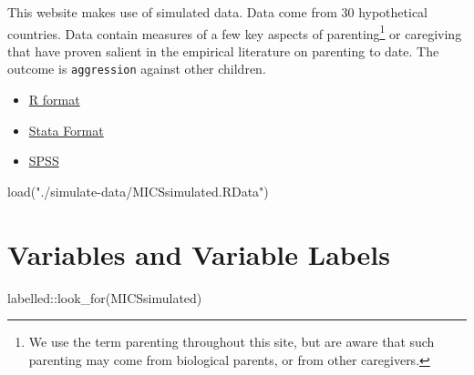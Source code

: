\documentclass[
  letterpaper,
  DIV=11,
  numbers=noendperiod]{scrreprt}
\newenvironment{Shaded}{\begin{snugshade}}{\end{snugshade}}
\newcommand{\FunctionTok}[1]{\textcolor[rgb]{0.28,0.35,0.67}{#1}}
\newcommand{\NormalTok}[1]{\textcolor[rgb]{0.00,0.23,0.31}{#1}}
\newcommand{\SpecialCharTok}[1]{\textcolor[rgb]{0.37,0.37,0.37}{#1}}
\newcommand{\StringTok}[1]{\textcolor[rgb]{0.13,0.47,0.30}{#1}}
\providecommand{\tightlist}{%
  \setlength{\itemsep}{0pt}\setlength{\parskip}{0pt}}\usepackage{longtable,booktabs,array}
\begin{document}
This website makes use of simulated data. Data come from 30 hypothetical
countries. Data contain measures of a few key aspects of
parenting\footnote{We use the term parenting throughout this site, but
  are aware that such parenting may come from biological parents, or
  from other caregivers.} or caregiving that have proven salient in the
empirical literature on parenting to date. The outcome is
\texttt{aggression} against other children.

\begin{tcolorbox}[enhanced jigsaw, bottomrule=.15mm, left=2mm, colframe=quarto-callout-note-color-frame, title=\textcolor{quarto-callout-note-color}{\faInfo}\hspace{0.5em}{Download The Data}, colback=white, leftrule=.75mm, coltitle=black, rightrule=.15mm, colbacktitle=quarto-callout-note-color!10!white, opacityback=0, toptitle=1mm, toprule=.15mm, breakable, opacitybacktitle=0.6, bottomtitle=1mm, arc=.35mm, titlerule=0mm]

\begin{itemize}
\tightlist
\item
  \href{https://github.com/agrogan1/globalfamilies/raw/main/simulate-data/MICSsimulated.RData}{R
  format}
\item
  \href{https://github.com/agrogan1/globalfamilies/raw/main/simulate-data/MICSsimulated.dta}{Stata
  Format}
\item
  \href{https://github.com/agrogan1/globalfamilies/raw/main/simulate-data/MICSsimulated.sav}{SPSS}
\end{itemize}

\end{tcolorbox}

\begin{Shaded}
\begin{Highlighting}[]
\FunctionTok{load}\NormalTok{(}\StringTok{"./simulate{-}data/MICSsimulated.RData"}\NormalTok{)}
\end{Highlighting}
\end{Shaded}

\hypertarget{variables-and-variable-labels}{%
\section{Variables and Variable
Labels}\label{variables-and-variable-labels}}

\begin{Shaded}
\begin{Highlighting}[]
\NormalTok{labelled}\SpecialCharTok{::}\FunctionTok{look\_for}\NormalTok{(MICSsimulated)}
\end{Highlighting}
\end{Shaded}
\end{document}
